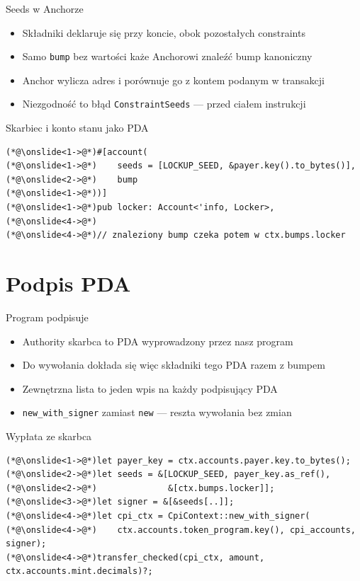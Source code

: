 \begin{frame}[fragile]{Seeds w Anchorze}
  \begin{itemize}
    \item Składniki deklaruje się przy koncie, obok pozostałych constraints
    \item Samo \texttt{bump} bez wartości każe Anchorowi znaleźć bump kanoniczny
    \item Anchor wylicza adres i porównuje go z kontem podanym w transakcji
    \item Niezgodność to błąd \texttt{ConstraintSeeds} --- przed ciałem instrukcji
  \end{itemize}
  \begin{codeblock}{Skarbiec i konto stanu jako PDA}
\begin{lstlisting}[style=reveal]
(*@\onslide<1->@*)#[account(
(*@\onslide<1->@*)    seeds = [LOCKUP_SEED, &payer.key().to_bytes()],
(*@\onslide<2->@*)    bump
(*@\onslide<1->@*))]
(*@\onslide<1->@*)pub locker: Account<'info, Locker>,
(*@\onslide<4->@*)
(*@\onslide<4->@*)// znaleziony bump czeka potem w ctx.bumps.locker
\end{lstlisting}
  \end{codeblock}
\end{frame}

\section{Podpis PDA}

\begin{frame}[fragile]{Program podpisuje}
  \begin{itemize}
    \item Authority skarbca to PDA wyprowadzony przez nasz program
    \item Do wywołania dokłada się więc składniki tego PDA razem z bumpem
    \item Zewnętrzna lista to jeden wpis na każdy podpisujący PDA
    \item \texttt{new\_with\_signer} zamiast \texttt{new} --- reszta wywołania bez zmian
  \end{itemize}
  \begin{codeblock}{Wypłata ze skarbca}
\begin{lstlisting}[style=reveal]
(*@\onslide<1->@*)let payer_key = ctx.accounts.payer.key.to_bytes();
(*@\onslide<2->@*)let seeds = &[LOCKUP_SEED, payer_key.as_ref(),
(*@\onslide<2->@*)              &[ctx.bumps.locker]];
(*@\onslide<3->@*)let signer = &[&seeds[..]];
(*@\onslide<4->@*)let cpi_ctx = CpiContext::new_with_signer(
(*@\onslide<4->@*)    ctx.accounts.token_program.key(), cpi_accounts, signer);
(*@\onslide<4->@*)transfer_checked(cpi_ctx, amount, ctx.accounts.mint.decimals)?;
\end{lstlisting}
  \end{codeblock}
\end{frame}


